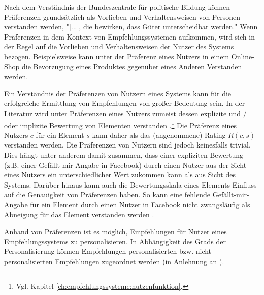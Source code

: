 Nach dem Verständnis der Bundeszentrale für politische Bildung können Präferenzen grundsätzlich als Vorlieben und Verhaltensweisen von Personen verstanden werden, "[...], die bewirken, dass Güter unterscheidbar werden."\cite{pollert:book}
Wenn Präferenzen in dem Kontext von Empfehlungssystemen aufkommen, wird sich in der Regel auf die Vorlieben und Verhaltensweisen der Nutzer des Systems bezogen.
Beispielsweise kann unter der Präferenz eines Nutzers in einem Online-Shop die Bevorzugung eines Produktes gegenüber eines Anderen Verstanden werden.

Ein Verständnis der Präferenzen von Nutzern eines Systems kann für die erfolgreiche Ermittlung von Empfehlungen von großer Bedeutung sein. %
In der Literatur wird unter Präferenzen eines Nutzers zumeist dessen explizite und / oder implizite Bewertung von Elementen verstanden \cite[S. 37]{berkovsky:2:article}\cite[S. 743]{adomavicius:inproceedings}\cite[S. 11]{recommenderSystems:2016}\cite[S. 129]{ekstrand:article}\cite[S. 899]{adomavicius:article}.\footnote{Vgl. Kapitel \ref{ch:empfehlungssysteme:nutzenfunktion}.}
Die Präferenz eines Nutzers $c$ für ein Element $s$ kann daher als das (angenommene) Rating $R(c,s)$ verstanden werden.
Die Präferenzen von Nutzern sind jedoch keinesfalls trivial.
Dies hängt unter anderem damit zusammen, dass einer expliziten Bewertung (z.B. einer Gefällt-mir-Angabe in Facebook) durch einen Nutzer aus der Sicht eines Nutzers ein unterschiedlicher Wert zukommen kann als aus Sicht des Systems.
Darüber hinaus kann auch die Bewertungsskala eines Elements Einfluss auf die Genauigkeit von Präferenzen haben.
So kann eine fehlende Gefällt-mir-Angabe für ein Element durch einen Nutzer in Facebook nicht zwangsläufig als Abneigung für das Element verstanden werden \cite[S. 11]{recommenderSystems:2016}.

Anhand von Präferenzen ist es möglich, Empfehlungen für Nutzer eines Empfehlungssystems zu personalisieren.
In Abhängigkeit des Grads der Personalisierung können Empfehlungen personalisierten bzw. nicht-personali\-sierten Empfehlungen zugeordnet werden (in Anlehnung an \cite[S. 400]{unternährer:article}).

